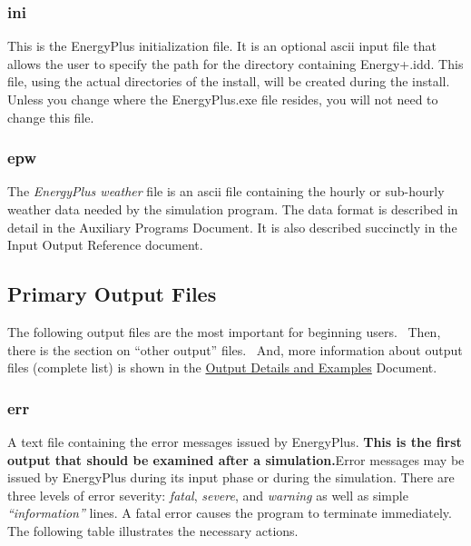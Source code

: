 \subsubsection{ini}\label{ini}

This is the EnergyPlus initialization file. It is an optional ascii input file that allows the user to specify the path for the directory containing Energy+.idd. This file, using the actual directories of the install, will be created during the install. Unless you change where the EnergyPlus.exe file resides, you will not need to change this file.

\subsubsection{epw}\label{epw}

The \emph{EnergyPlus weather} file is an ascii file containing the hourly or sub-hourly weather data needed by the simulation program. The data format is described in detail in the Auxiliary Programs Document. It is also described succinctly in the Input Output Reference document.

\subsection{Primary Output Files}\label{primary-output-files}

The following output files are the most important for beginning users.~ Then, there is the section on ``other output'' files.~ And, more information about output files (complete list) is shown in the \href{https://energyplus.readthedocs.io/en/latest/guides/output-details-and-examples/index.html}{Output Details and Examples} Document.

\subsubsection{err}\label{err}

A text file containing the error messages issued by EnergyPlus. \textbf{This is the first output that should be examined after a simulation.}Error messages may be issued by EnergyPlus during its input phase or during the simulation. There are three levels of error severity: \emph{fatal}, \emph{severe}, and \emph{warning} as well as simple \emph{``information''} lines. A fatal error causes the program to terminate immediately. The following table illustrates the necessary actions.

